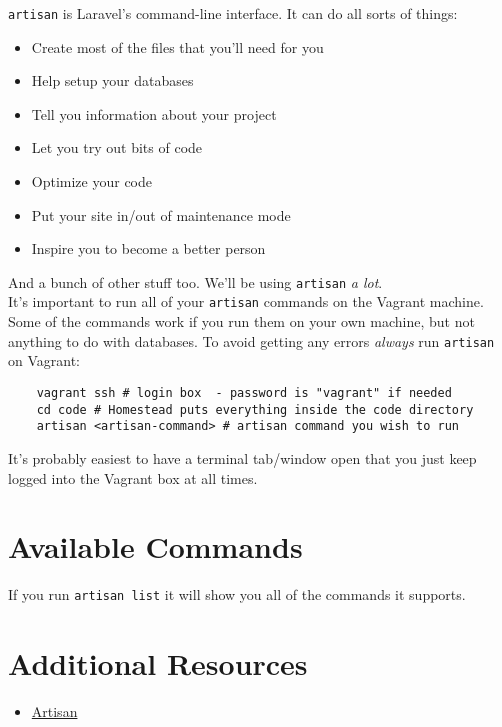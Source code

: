 \texttt{artisan} is Laravel's command-line interface. It can do all sorts of things:

\begin{itemize}
    \item Create most of the files that you'll need for you
    \item Help setup your databases
    \item Tell you information about your project
    \item Let you try out bits of code
    \item Optimize your code
    \item Put your site in/out of maintenance mode
    \item Inspire you to become a better person
\end{itemize}

And a bunch of other stuff too. We'll be using \texttt{artisan} \textit{a lot}.
\\

It's important to run all of your \texttt{artisan} commands on the Vagrant machine. Some of the commands work if you run them on your own machine, but not anything to do with databases. To avoid getting any errors \textit{always} run \texttt{artisan} on Vagrant:

\begin{verbatim}
    vagrant ssh # login box  - password is "vagrant" if needed
    cd code # Homestead puts everything inside the code directory
    artisan <artisan-command> # artisan command you wish to run
\end{verbatim}

It's probably easiest to have a terminal tab/window open that you just keep logged into the Vagrant box at all times.

\section{Available Commands}

If you run \texttt{artisan list} it will show you all of the commands it supports.


\section{Additional Resources}

\begin{itemize}[leftmargin=*]
    \item \href{http://laravel.com/docs/master/artisan}{Artisan}
\end{itemize}
